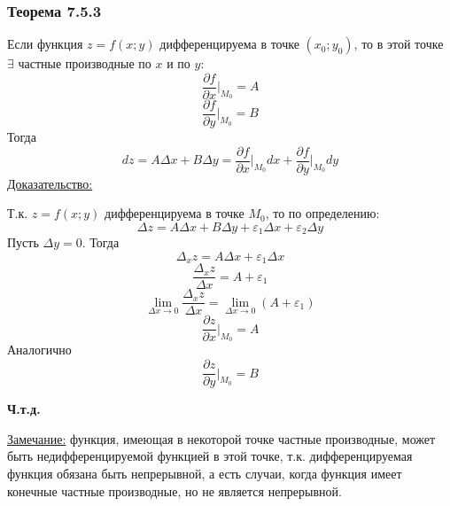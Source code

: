 \documentclass[12pt]{article}
\begin{document}
    \subsubsection*{Теорема 7.5.3}\label{th:7.5.3}
    Если функция $z = f(x; y)$ дифференцируема в точке $(x_0; y_0)$, то в этой точке $\exists$ частные производные по $x$ и по $y$:
    \[ \frac{\partial f}{\partial x} \Big|_{M_0} = A \]
    \[ \frac{\partial f}{\partial y} \Big|_{M_0} = B \]
    Тогда 
    \[ dz = A\Delta x + B\Delta y = \frac{\partial f}{\partial x} \Big|_{M_0}dx + \frac{\partial f}{\partial y} \Big|_{M_0}dy \]
    \underline{Доказательство:}
    \begin{adjustwidth}{1.5em}{1.5em}
        Т.к. $z = f(x;y)$ дифференцируема в точке $M_0$, то по определению:
        \[ \Delta z = A \Delta x + B \Delta y + \varepsilon_1 \Delta x + \varepsilon_2 \Delta y \]
        Пусть $\Delta y = 0$. Тогда 
        \[ \Delta_x z = A \Delta x + \varepsilon_1 \Delta x \]
        \[ \frac{\Delta_x z}{\Delta x} = A + \varepsilon_1 \]
        \[ \lim_{\Delta x \to 0} \frac{\Delta_x z}{\Delta x} = \lim_{\Delta x \to 0}(A + \varepsilon_1) \]
        \[ \frac{\partial z}{\partial x} \Big|_{M_0} = A \]
        Аналогично
        \[ \frac{\partial z}{\partial y} \Big|_{M_0} = B \]
        \begin{center}
            \textbf{Ч.т.д.}
        \end{center}
    \end{adjustwidth}
    \underline{Замечание:} функция, имеющая в некоторой точке частные производные, может быть недифференцируемой функцией в этой точке, т.к. дифференцируемая функция обязана быть непрерывной, а есть случаи, когда функция имеет конечные частные производные, но не является непрерывной.
\end{document}
